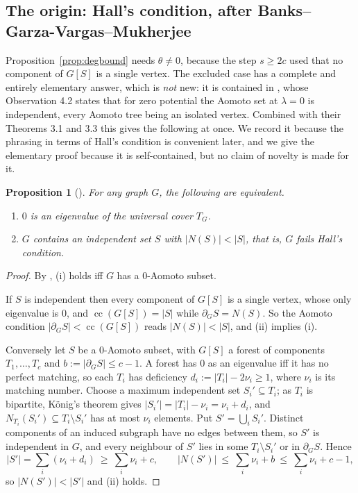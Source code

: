 \documentclass[11pt]{article}
\newtheorem{proposition}[theorem]{Proposition}
\theoremstyle{remark}
\begin{document}
\subsection{The origin: Hall's condition, after Banks--Garza-Vargas--Mukherjee}\label{sec:hallzero}

Proposition~\ref{prop:degbound} needs $\theta\ne0$, because the step $s\ge2c$ used that no
component of $G[S]$ is a single vertex. The excluded case has a complete and entirely elementary
answer, which is \emph{not} new: it is contained in \cite{BGM}, whose Observation 4.2 states that
for zero potential the Aomoto set at $\lambda=0$ is independent, every Aomoto tree being an
isolated vertex. Combined with their Theorems 3.1 and 3.3 this gives the following at once. We
record it because the phrasing in terms of Hall's condition is convenient later, and we give the
elementary proof because it is self-contained, but no claim of novelty is made for it.

\begin{proposition}[{\cite[Observation 4.2 with Theorems 3.1 and 3.3]{BGM}}]\label{thm:hallzero}
For any graph $G$, the following are equivalent.
\begin{enumerate}
\item $0$ is an eigenvalue of the universal cover $T_G$.
\item $G$ contains an independent set $S$ with $|N(S)|<|S|$, that is, $G$ fails Hall's condition.
\end{enumerate}
\end{proposition}

\begin{proof}
By \cite{BGM}, (i) holds iff $G$ has a $0$-Aomoto subset.

If $S$ is independent then every component of $G[S]$ is a single vertex, whose only eigenvalue is
$0$, and $\operatorname{cc}(G[S])=|S|$ while $\partial_GS=N(S)$. So the Aomoto condition
$|\partial_GS|<\operatorname{cc}(G[S])$ reads $|N(S)|<|S|$, and (ii) implies (i).

Conversely let $S$ be a $0$-Aomoto subset, with $G[S]$ a forest of components $T_1,\dots,T_c$ and
$b:=|\partial_GS|\le c-1$. A forest has $0$ as an eigenvalue iff it has no perfect matching, so
each $T_i$ has deficiency $d_i:=|T_i|-2\nu_i\ge1$, where $\nu_i$ is its matching number. Choose a
maximum independent set $S_i'\subseteq T_i$; as $T_i$ is bipartite, K\"onig's theorem gives
$|S_i'|=|T_i|-\nu_i=\nu_i+d_i$, and $N_{T_i}(S_i')\subseteq T_i\setminus S_i'$ has at most $\nu_i$
elements. Put $S'=\bigcup_iS_i'$. Distinct components of an induced subgraph have no edges between
them, so $S'$ is independent in $G$, and every neighbour of $S'$ lies in some
$T_i\setminus S_i'$ or in $\partial_GS$. Hence
\[
  |S'|=\sum_i(\nu_i+d_i)\ \ge\ \sum_i\nu_i+c,
  \qquad
  |N(S')|\ \le\ \sum_i\nu_i+b\ \le\ \sum_i\nu_i+c-1 ,
\]
so $|N(S')|<|S'|$ and (ii) holds.
\end{proof}
\end{document}
